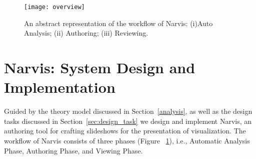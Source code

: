
\begin{figure}
 \centering %
 \texttt{[image: overview]}
 \caption{An abstract representation of the workflow of Narvis: (i)Auto Analysis; (ii) Authoring; (iii) Reviewing.}
 \label{fig:overview}
\end{figure}


\section{Narvis: System Design and Implementation}


Guided by the theory model discussed in Section~\ref{analysis}, as well as the design tasks discussed in Section~\ref{sec:design_task} we design and implement Narvis, an authoring tool for crafting slideshows for the presentation of visualization. The workflow of Narvis consists of three phases (Figure ~\ref{fig:overview}), i.e., Automatic Analysis Phase, Authoring Phase, and Viewing Phase.




